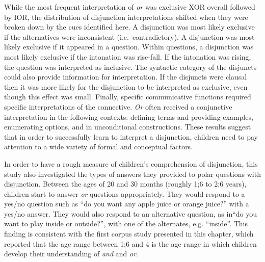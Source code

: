 \documentclass[floatsintext,man]{apa6}
\theoremstyle{definition}
\theoremstyle{definition}
\theoremstyle{definition}
\theoremstyle{remark}
\begin{document}
While the most frequent interpretation of \emph{or} was exclusive XOR
overall followed by IOR, the distribution of disjunction interpretations
shifted when they were broken down by the cues identified here. A
disjunction was most likely exclusive if the alternatives were
inconsistent (i.e.~contradictory). A disjunction was most likely
exclusive if it appeared in a question. Within questions, a disjunction
was most likely exclusive if the intonation was rise-fall. If the
intonation was rising, the question was interpreted as inclusive. The
syntactic category of the disjuncts could also provide information for
interpretation. If the disjuncts were clausal then it was more likely
for the disjunction to be interpreted as exclusive, even though this
effect was small. Finally, specific communicative functions required
specific interpretations of the connective. \emph{Or} often received a
conjunctive interpretation in the following contexts: defining terms and
providing examples, enumerating options, and in unconditional
constructions. These results suggest that in order to successfully learn
to interpret a disjunction, children need to pay attention to a wide
variety of formal and conceptual factors.

In order to have a rough measure of children's comprehension of
disjunction, this study also investigated the types of answers they
provided to polar questions with disjunction. Between the ages of 20 and
30 months (roughly 1;6 to 2;6 years), children start to answer \emph{or}
questions appropriately. They would respond to a yes/no question such as
\enquote{do you want any apple juice or orange juice?} with a yes/no
answer. They would also respond to an alternative question, as
in\enquote{do you want to play inside or outside?}, with one of the
alternates, e.g. \enquote{inside}. This finding is consistent with the
first corpus study presented in this chapter, which reported that the
age range between 1;6 and 4 is the age range in which children develop
their understanding of \emph{and} and \emph{or}.
\end{document}
